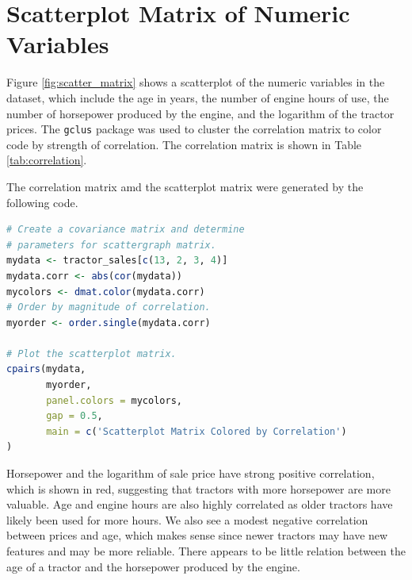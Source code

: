 \pagebreak
\section{Scatterplot Matrix of Numeric Variables}

Figure \ref{fig:scatter_matrix}
shows a scatterplot of the numeric variables in the dataset,
which include
the age in years, the number of engine hours of use,
the number of horsepower produced by the engine,
and the logarithm of the tractor prices.
The \texttt{gclus} package was used to cluster the
correlation matrix to color code by strength of correlation.
The correlation matrix is shown in Table \ref{tab:correlation}.



The correlation matrix amd the scatterplot matrix
were generated by the following code.

\begin{lstlisting}[language=R]
# Create a covariance matrix and determine
# parameters for scattergraph matrix.
mydata <- tractor_sales[c(13, 2, 3, 4)]
mydata.corr <- abs(cor(mydata))
mycolors <- dmat.color(mydata.corr)
# Order by magnitude of correlation.
myorder <- order.single(mydata.corr)

# Plot the scatterplot matrix.
cpairs(mydata,
       myorder,
       panel.colors = mycolors,
       gap = 0.5,
       main = c('Scatterplot Matrix Colored by Correlation')
)
\end{lstlisting}


\pagebreak
Horsepower and the logarithm of sale price have strong positive correlation, which is shown in red,
suggesting that tractors with more horsepower are more valuable.
Age and engine hours are also highly correlated
as older tractors have likely been used for more hours.
We also see a modest negative correlation between prices and age,
which makes sense since newer tractors may have new features and may be more reliable.
There appears to be little relation between the
age of a tractor and the horsepower produced by the engine.

